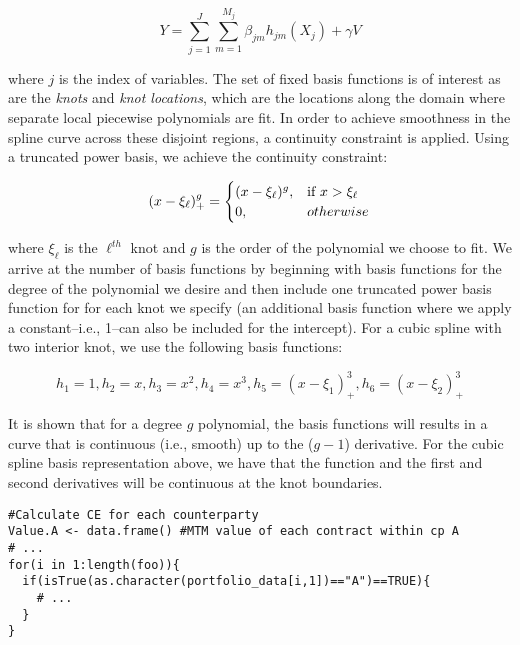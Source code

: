 \documentclass{article}
\begin{document}
$$Y=\sum_{j=1}^{J}\sum_{m=1}^{M_j}{\beta_{jm}{h_{jm}}(X_j)+\gamma V}$$

where $j$ is the index of variables. The set of fixed basis functions is of interest as are the \textit{knots} and \textit{knot locations}, which are the locations along the domain where separate local piecewise polynomials are fit. In order to achieve smoothness in the spline curve across these disjoint regions, a continuity constraint is applied. Using a truncated power basis, we achieve the continuity constraint:

\begin{equation}
(x-\xi_\ell)^{g}_{+}=\begin{cases}
(x-\xi_\ell)^{g}, & \text{if  } x > \xi_\ell \\
0, & otherwise  \notag \\
\end{cases}
\end{equation}

where $\xi_{\ell}$ is the $\ell^{th}$ knot and $g$ is the order of the polynomial we choose to fit. We arrive at the number of basis functions by beginning with basis functions for the degree of the polynomial we desire and then include one truncated power basis function for for each knot we specify (an additional basis function where we apply a constant--i.e., 1--can also be included for the intercept).\supercite{james_introduction_2013} For a cubic spline with two interior knot, we use the following basis functions:

$$h_1=1,h_2=x, h_3=x^2, h_4=x^3,h_5=(x-\xi_1)^{3}_{+},h_6=(x-\xi_2)^{3}_{+}$$

It is shown that for a degree $g$ polynomial, the basis functions will results in a curve that is continuous (i.e., smooth) up to the ($g-1$) derivative. \supercite{james_introduction_2013} For the cubic spline basis representation above, we have that the function and the first and second derivatives will be continuous at the knot boundaries.

\newpage
\begin{lstlisting}
#Calculate CE for each counterparty
Value.A <- data.frame() #MTM value of each contract within cp A
# ...
for(i in 1:length(foo)){
  if(isTrue(as.character(portfolio_data[i,1])=="A")==TRUE){
    # ...
  }
}
\end{lstlisting}


\printbibliography[title={References}]
\end{document}
